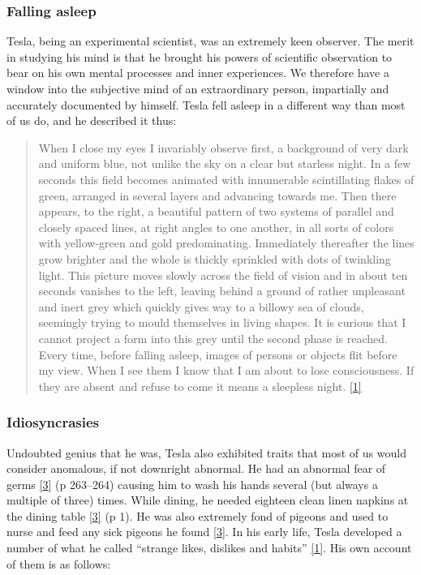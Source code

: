 \documentclass[
  a4paper,
]{article}
\begin{document}
\hypertarget{falling-asleep}{%
\subsubsection{Falling asleep}\label{falling-asleep}}

Tesla, being an experimental scientist, was an extremely keen observer.
The merit in studying his mind is that he brought his powers of
scientific observation to bear on his own mental processes and inner
experiences. We therefore have a window into the subjective mind of an
extraordinary person, impartially and accurately documented by himself.
Tesla fell asleep in a different way than most of us do, and he
described it thus:

\begin{quote}
When I close my eyes I invariably observe first, a background of very
dark and uniform blue, not unlike the sky on a clear but starless night.
In a few seconds this field becomes animated with innumerable
scintillating flakes of green, arranged in several layers and advancing
towards me. Then there appears, to the right, a beautiful pattern of two
systems of parallel and closely spaced lines, at right angles to one
another, in all sorts of colors with yellow-green and gold
predominating. Immediately thereafter the lines grow brighter and the
whole is thickly sprinkled with dots of twinkling light. This picture
moves slowly across the field of vision and in about ten seconds
vanishes to the left, leaving behind a ground of rather unpleasant and
inert grey which quickly gives way to a billowy sea of clouds, seemingly
trying to mould themselves in living shapes. It is curious that I cannot
project a form into this grey until the second phase is reached. Every
time, before falling asleep, images of persons or objects flit before my
view. When I see them I know that I am about to lose consciousness. If
they are absent and refuse to come it means a sleepless night.
\protect\hyperlink{ref-john83}{{[}1{]}}
\end{quote}

\hypertarget{idiosyncrasies}{%
\subsubsection{Idiosyncrasies}\label{idiosyncrasies}}

Undoubted genius that he was, Tesla also exhibited traits that most of
us would consider anomalous, if not downright abnormal. He had an
abnormal fear of germs \protect\hyperlink{ref-cheney81}{{[}3{]}} (p
263--264) causing him to wash his hands several (but always a multiple
of three) times. While dining, he needed eighteen clean linen napkins at
the dining table \protect\hyperlink{ref-cheney81}{{[}3{]}} (p 1). He was
also extremely fond of pigeons and used to nurse and feed any sick
pigeons he found \protect\hyperlink{ref-cheney81}{{[}3{]}}. In his early
life, Tesla developed a number of what he called ``strange likes,
dislikes and habits'' \protect\hyperlink{ref-john83}{{[}1{]}}. His own
account of them is as follows:
\end{document}
